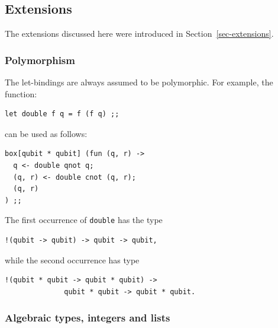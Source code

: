 \subsection{Extensions}

The extensions discussed here were introduced in
Section~\hyperref[sec-extensions]{\ref*{sec-extensions}}.

\subsubsection{Polymorphism}

The let-bindings are always assumed to be polymorphic. For example, the 
function:
\begin{verbatim}
let double f q = f (f q) ;;
\end{verbatim}
can be used as follows:
\begin{verbatim}
box[qubit * qubit] (fun (q, r) ->
  q <- double qnot q;
  (q, r) <- double cnot (q, r);
  (q, r)
) ;;
\end{verbatim}
The first occurrence of \verb#double# has the type 
\begin{verbatim}
!(qubit -> qubit) -> qubit -> qubit,
\end{verbatim}
while the second occurrence has type 
\begin{verbatim}
!(qubit * qubit -> qubit * qubit) -> 
              qubit * qubit -> qubit * qubit.
\end{verbatim}

\subsubsection{Algebraic types, integers and lists}

